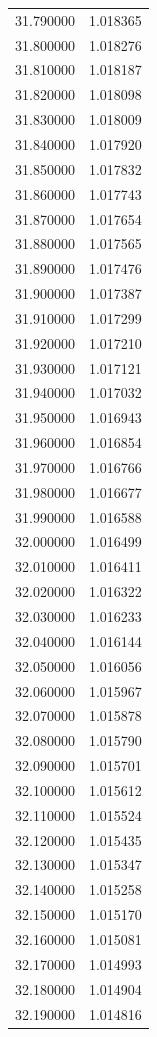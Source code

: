 \begin{tabular}{rr}
31.790000 & 1.018365 \\
31.800000 & 1.018276 \\
31.810000 & 1.018187 \\
31.820000 & 1.018098 \\
31.830000 & 1.018009 \\
31.840000 & 1.017920 \\
31.850000 & 1.017832 \\
31.860000 & 1.017743 \\
31.870000 & 1.017654 \\
31.880000 & 1.017565 \\
31.890000 & 1.017476 \\
31.900000 & 1.017387 \\
31.910000 & 1.017299 \\
31.920000 & 1.017210 \\
31.930000 & 1.017121 \\
31.940000 & 1.017032 \\
31.950000 & 1.016943 \\
31.960000 & 1.016854 \\
31.970000 & 1.016766 \\
31.980000 & 1.016677 \\
31.990000 & 1.016588 \\
32.000000 & 1.016499 \\
32.010000 & 1.016411 \\
32.020000 & 1.016322 \\
32.030000 & 1.016233 \\
32.040000 & 1.016144 \\
32.050000 & 1.016056 \\
32.060000 & 1.015967 \\
32.070000 & 1.015878 \\
32.080000 & 1.015790 \\
32.090000 & 1.015701 \\
32.100000 & 1.015612 \\
32.110000 & 1.015524 \\
32.120000 & 1.015435 \\
32.130000 & 1.015347 \\
32.140000 & 1.015258 \\
32.150000 & 1.015170 \\
32.160000 & 1.015081 \\
32.170000 & 1.014993 \\
32.180000 & 1.014904 \\
32.190000 & 1.014816 \\

\end{tabular}
